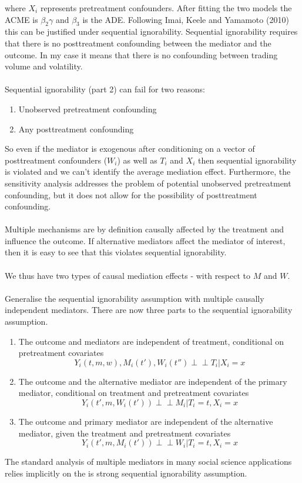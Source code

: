 \documentclass{article}
\newcommand{\indep}{\perp\!\!\!\!\perp}
\begin{document}
	where $X_i$ represents pretreatment confounders. After fitting the two models the ACME is $\beta_2 \gamma$ and $\beta_3 $ is the ADE. Following Imai, Keele and Yamamoto (2010) this can be justified under sequential ignorability. Sequential ignorability requires that there is no posttreatment confounding between the mediator and the outcome. In my case it means that there is no confounding between trading volume and volatility. 
	\\~\\
	Sequential ignorability (part 2) can fail for two reasons:
	\begin{enumerate}
		\item Unobserved pretreatment confounding
		\item Any posttreatment confounding
	\end{enumerate}
	So even if the mediator is exogenous after conditioning on a vector of posttreatment confounders ($W_i$) as well as $T_i$ and $X_i$ then sequential ignorability is violated and we can't identify the average mediation effect. Furthermore, the sensitivity analysis addresses the problem of potential unobserved pretreatment confounding, but it does not allow for the possibility of posttreatment confounding. 
	\\~\\
	Multiple mechanisms are by definition causally affected by the treatment and influence the outcome. If alternative mediators affect the mediator of interest, then it is easy to see that this violates sequential ignorability. 
	\\~\\
	We thus have two types of causal mediation effects - with respect to $M$ and $W$. 
	\\~\\
	Generalise the sequential ignorability assumption with multiple causally independent mediators. There are now three parts to the sequential ignorability assumption. 
	\begin{enumerate}
		\item The outcome and mediators are independent of treatment, conditional on pretreatment covariates 
		$$
		Y_i(t,m,w), M_i(t'), W_i(t'') \indep T_i | X_i = x
		$$
		\item The outcome and the alternative mediator are independent of the primary mediator, conditional on treatment and pretreatment covariates
		$$
		Y_i(t', m, W_i(t')) \indep M_i | T_i =t, X_i = x
		$$
		\item The outcome and primary mediator are independent of the alternative mediator, given the treatment and pretreatment covariates
		$$
		Y_i(t', m, M_i(t')) \indep W_i | T_i =t, X_i = x
		$$
	\end{enumerate}
	The standard analysis of multiple mediators in many social science applications relies implicitly on the is strong sequential ignorability assumption. 
	
\end{document}
